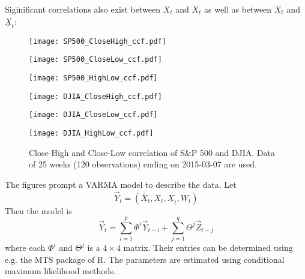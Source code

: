 \documentclass{article}
\begin{document}
Siginificant correlations also exist between $X_t$ and $\overline X_t$
as well as between $X_t$ and $\underline X_t$:
\begin{figure}[!htb]
\begin{minipage}{0.33\linewidth}
  \texttt{[image: SP500\_CloseHigh\_ccf.pdf]}
\end{minipage}\hfill
\begin{minipage}{0.33\linewidth}
  \texttt{[image: SP500\_CloseLow\_ccf.pdf]}
\end{minipage}\hfill
\begin{minipage}{0.33\linewidth}
  \texttt{[image: SP500\_HighLow\_ccf.pdf]}
\end{minipage}
\begin{minipage}{0.33\linewidth}
  \texttt{[image: DJIA\_CloseHigh\_ccf.pdf]}
\end{minipage}\hfill
\begin{minipage}{0.33\linewidth}
  \texttt{[image: DJIA\_CloseLow\_ccf.pdf]}
\end{minipage}\hfill
\begin{minipage}{0.33\linewidth}
  \texttt{[image: DJIA\_HighLow\_ccf.pdf]}
\end{minipage}
\caption{Close-High and Close-Low correlation of S\&P 500 and
  DJIA. Data of 25 weeks (120 observations) ending on 2015-03-07 are
  used.}
\end{figure}

The figures prompt a VARMA model to describe the data. Let
\[
\vec Y_t = (\overline X_t, X_t, \underline X_t, W_t)
\]
Then the model is
\[
\vec Y_t = \sum_{i=1}^p \Phi^i \vec Y_{t-i} + \sum_{j=1}^q \Theta^j \vec Z_{t-j}
\]
where each $\Phi^i$ and $\Theta^j$ is a $4 \times 4$ matrix. Their
entries can be determined using e.g. the MTS package of R. The
parameters are estimated using conditional maximum likelihood methods.
\end{document}
